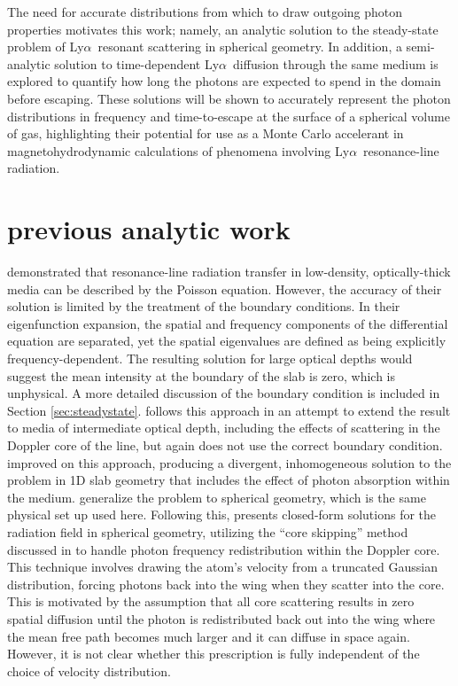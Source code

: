 \documentclass{aastex63}
\newcommand\lya{Ly$\alpha$\ }
\begin{document}
The need for accurate distributions from which to draw outgoing photon properties motivates this work; namely, an analytic solution to the steady-state problem of \lya resonant scattering in spherical geometry. In addition, a semi-analytic solution to time-dependent \lya diffusion through the same medium is explored to quantify how long the photons are expected to spend in the domain before escaping. These solutions will be shown to accurately represent the photon distributions in frequency and time-to-escape at the surface of a spherical volume of gas, highlighting their potential for use as a Monte Carlo accelerant in magnetohydrodynamic calculations of phenomena involving \lya resonance-line radiation.

\section{ previous analytic work }

\citet{1973MNRAS.162...43H, 1974MNRAS.166..373H} demonstrated that resonance-line radiation transfer in low-density, optically-thick media can be described by the Poisson equation. However, the accuracy of their solution is limited by the treatment of the boundary conditions. In their eigenfunction expansion, the spatial and frequency components of the differential equation are separated, yet the spatial eigenvalues are defined as being explicitly frequency-dependent. The resulting solution for large optical depths would suggest the mean intensity at the boundary of the slab is zero, which is unphysical. A more detailed discussion of the boundary condition is included in Section \ref{sec:steadystate}. \citet{1990ApJ...350..216N} follows this approach in an attempt to extend the result to media of intermediate optical depth, including the effects of scattering in the Doppler core of the line, but again does not use the correct boundary condition. \citet{?} improved on this approach, producing a divergent, inhomogeneous solution to the problem in 1D slab geometry that includes the effect of photon absorption within the medium. \citet{2006ApJ...649...14D} generalize the problem to spherical geometry, which is the same physical set up used here. Following this, \citet{2020arXiv200509692L} presents closed-form solutions for the radiation field in spherical geometry, utilizing the ``core skipping'' method discussed in \citet{2015MNRAS.449.4336S} to handle photon frequency redistribution within the Doppler core. This technique involves drawing the atom's velocity from a truncated Gaussian distribution, forcing photons back into the wing when they scatter into the core. This is motivated by the assumption that all core scattering results in zero spatial diffusion until the photon is redistributed back out into the wing where the mean free path becomes much larger and it can diffuse in space again. However, it is not clear whether this prescription is fully independent of the choice of velocity distribution.
\end{document}
